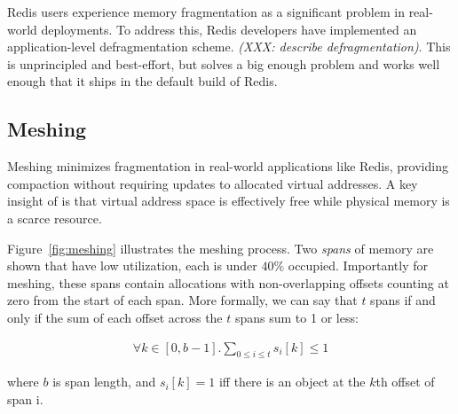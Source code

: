 

Redis users experience memory fragmentation as a significant problem
in real-world deployments.  To address this, Redis developers have
implemented an application-level defragmentation scheme.
\textit{(XXX: describe defragmentation)}.  This is unprincipled and
best-effort, but solves a big enough problem and works well enough
that it ships in the default build of Redis.

\subsection{Meshing}

Meshing minimizes fragmentation in real-world applications like Redis,
providing compaction without requiring updates to allocated virtual
addresses.  A key insight of \mesh is that virtual address space is
effectively free while physical memory is a scarce resource.

Figure~\ref{fig:meshing} illustrates the meshing process.  Two
\textit{spans} of memory are shown that have low utilization, each is
under $40\%$ occupied.  Importantly for meshing, these spans contain
allocations with non-overlapping offsets counting at zero from the
start of each span.  More formally, we can say that $t$ spans
\textit{\mesh} if and only if the sum of each offset across the $t$
spans sum to 1 or less:

\begin{align}
  \forall k \in [0, b-1]. \sum_{0 \leq i \leq t} s_i[k] \leq 1
\end{align}

where $b$ is span length, and $s_i[k] = 1$ iff there is an object at the $k$th offset of span i.

